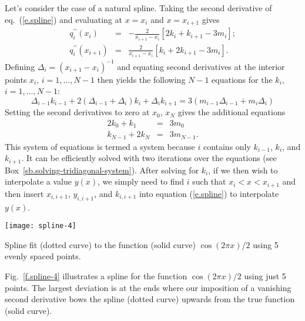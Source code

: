 Let's consider the case of a natural spline. Taking the second derivative of eq.~(\ref{e.spline}) and evaluating at $x=x_{i}$ and $x=x_{i+1}$ gives
\begin{eqnarray}
\label{e.d2spline-left}
q^{\prime\prime}_{i}(x_{i}) &=& -\frac{2}{x_{i+1}-x_{i}}\left[ 2k_{i} + k_{i+1} - 3m_{i} \right];\\
\label{e.d2spline-right}
q^{\prime\prime}_{i}(x_{i+1}) &=& \frac{2}{x_{i+1}-x_{i}}\left[ k_{i} + 2k_{i+1} - 3m_{i} \right].
\end{eqnarray}
Defining $\Delta_{i} = (x_{i+1}-x_{i})^{-1}$ and equating second derivatives at the interior points $x_{i},\,i=1,\ldots,N-1$ then yields the following $N-1$ equations for the $k_{i}$, $i=1,\ldots,N-1$:
\begin{equation}
\Delta_{i-1}k_{i-1} + 2\left(\Delta_{i-1} + \Delta_{i}\right) k_{i} + \Delta_{i}k_{i+1} = 3\left(m_{i-1}\Delta_{i-1} + m_{i}\Delta_{i}\right)
\end{equation}
Setting the second derivatives to zero at $x_{0}$, $x_{N}$ gives the additional equations
\begin{eqnarray}
2k_{0} + k_{1} &=& 3m_{0}\\
k_{N-1} + 2k_{N} &=& 3m_{N-1}.
\end{eqnarray}
This system of equations is termed a  system because $i$ contains only $k_{i-1}$, $k_{i}$, and $k_{i+1}$. It can be efficiently solved with two iterations over the equations (see Box~\ref{sb.solving-tridiagonal-system}). After solving for $k_{i}$, if we then wish to interpolate a value $y(x)$, we simply need to find $i$ such that $x_{i}< x < x_{i+1}$ and then insert $x_{i,i+1}$, $y_{i,i+1}$, and $k_{i,i+1}$ into equation (\ref{e.spline}) to interpolate $y(x)$.

\begin{marginfigure}
\texttt{[image: spline-4]}
\caption[Example of a spline fit]{\label{f.spline-4} Spline fit (dotted curve) to the function (solid curve) $\cos(2\pi x)/2$ using 5 evenly spaced points.}
\end{marginfigure}
Fig.~\ref{f.spline-4} illustrates a spline for the function $\cos(2\pi x)/2$ using just 5 points. The largest deviation is at the ends where our imposition of a vanishing second derivative bows the spline (dotted curve) upwards from the true function (solid curve).

